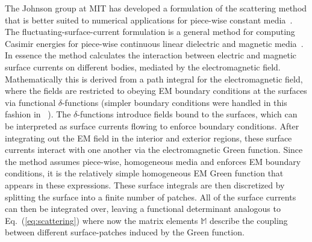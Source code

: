 The Johnson group at MIT has developed a formulation of the scattering method that is better suited to numerical 
applications for piece-wise constant media~\cite{Rodriguez2007,Rodriguez2007a, Rodriguez2009,Reid2009,Reid2011, Reid2013}.  
The fluctuating-surface-current formulation is a general method for computing Casimir
energies for piece-wise continuous linear dielectric and magnetic media~\cite{Reid2009,Reid2011, Reid2013}.  
In essence the method calculates the interaction between electric and magnetic surface currents 
on different bodies, mediated by the electromagnetic field.  Mathematically this is derived 
from a path integral for the electromagnetic field, where the fields are restricted to obeying EM boundary conditions at the 
surfaces via functional $\delta$-functions (simpler boundary conditions were handled in this fashion in
~\cite{Bordag1985,Li1991}).  The $\delta$-functions introduce fields 
bound to the surfaces, which can be interpreted as surface currents flowing to enforce boundary conditions.
After integrating out the EM field in the interior and exterior regions, 
these surface currents interact with one another via the electromagnetic Green function.
Since the method assumes piece-wise, homogeneous media and enforces EM boundary
conditions, it is the relatively simple homogeneous EM Green function that appears in these expressions.
These surface integrals are then discretized by splitting the surface into a finite number of patches.
All of the surface currents can then be integrated over, leaving a functional determinant analogous to Eq.~(\ref{eq:scattering})
where now the matrix elements $\mathbb{M}$ describe the coupling between different surface-patches induced
by the Green function.  

